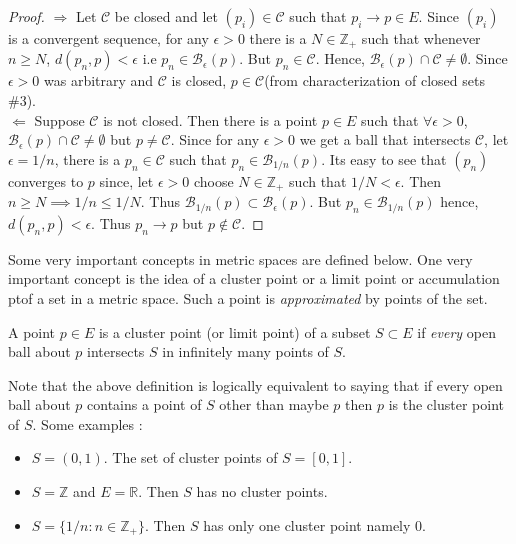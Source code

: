 \begin{proof}
    $\Rightarrow$ 
     Let $\mathcal{C}$ be closed and let $\left(p_i\right) \in \mathcal{C}$ such that $p_i
 \rightarrow p \in E$. Since $\left(p_i\right)$ is a convergent sequence, for any $\epsilon > 0$
 there is a $N \in \mathbb{Z}_+$ such that whenever $n \geq N$, $d(p_n,p) < \epsilon$ i.e 
$p_n \in \mathcal{B}_{\epsilon}(p)$. But $p_n \in \mathcal{C}$. Hence, $\mathcal{B}_{\epsilon}(p) \cap
\mathcal{C} \neq \emptyset$. Since $\epsilon > 0$ was arbitrary and $\mathcal{C}$ is closed, $p \in
\mathcal{C}$(from characterization of closed sets \#3). \\
$\Leftarrow$ 
Suppose $\mathcal{C}$ is not closed. Then there is a point $p \in E$ such that $\forall \epsilon >
0$, $\mathcal{B}_{\epsilon}(p) \cap \mathcal{C} \neq \emptyset$ but $p \neq \mathcal{C}$. Since for 
any $\epsilon >0$ we get a ball that intersects $\mathcal{C}$, let $\epsilon = 1/n$, there is a 
$p_n \in \mathcal{C}$ such that $p_n \in \mathcal{B}_{1/n}(p)$. Its easy to see that $\left(p_n\right)$
converges to $p$ since, let $\epsilon > 0$ choose $N \in \mathbb{Z}_+$ such that $1/N < \epsilon$.
Then $n \geq N \implies 1/n \leq 1/N$. Thus $\mathcal{B}_{1/n}(p) \subset \mathcal{B}_{\epsilon}(p)$.
But $p_n \in \mathcal{B}_{1/n}(p)$ hence, $d(p_n,p) < \epsilon$. Thus $p_n \rightarrow p$ but $p
\not \in \mathcal{C}$.
\end{proof}
Some very important concepts in metric spaces are defined below. One very important concept is the
idea of a cluster point or a limit point or accumulation ptof a set in a metric space. 
Such a point is \emph{approximated} by points of the set.
\begin{Definition}
    A point $p \in E$ is a cluster point (or limit point) of a subset $S \subset E$ if \emph{every}
    open ball about $p$ intersects $S$ in infinitely many points of $S$.
\end{Definition}
Note that the above definition is logically equivalent to saying that if every open ball about $p$
contains a point of $S$ other than maybe $p$ then $p$ is the cluster point of $S$.
Some examples :
\begin{itemize}
    \item $S = \left(0,1\right)$. The set of cluster points of $S = \left[0,1\right]$.
    \item $S = \mathbb{Z}$ and $E = \mathbb{R}$. Then $S$ has no cluster points.
    \item $S = \left.\lbrace 1/n : n \in \mathbb{Z}_+\rbrace\right.$. Then $S$ has only one cluster
	point namely $0$.
\end{itemize}
